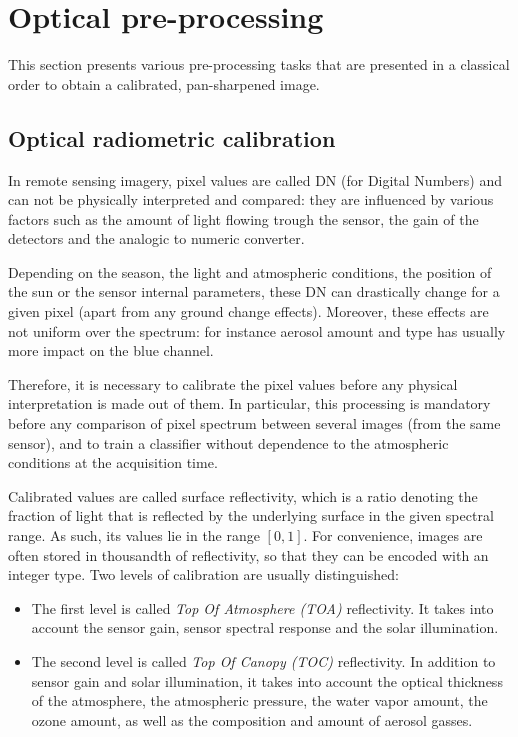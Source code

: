 \section{Optical pre-processing}\label{sec:optpreproc}

This section presents various pre-processing tasks that are presented in 
a classical order to obtain a calibrated, pan-sharpened image. 

\subsection{Optical radiometric calibration}\label{ssec:optcal}

In remote sensing imagery, pixel values are called DN (for Digital
Numbers) and can not be physically interpreted and compared: they are
influenced by various factors such as the amount of light flowing
trough the sensor, the gain of the detectors and the analogic to
numeric converter.

Depending on the season, the light and atmospheric conditions, the
position of the sun or the sensor internal parameters, these DN can
drastically change for a given pixel (apart from any ground change
effects). Moreover, these effects are not uniform over the spectrum:
for instance aerosol amount and type has usually more impact on the
blue channel.

Therefore, it is necessary to calibrate the pixel values before any
physical interpretation is made out of them. In particular, this
processing is mandatory before any comparison of pixel spectrum
between several images (from the same sensor), and to train a
classifier without dependence to the atmospheric conditions at the
acquisition time.

Calibrated values are called surface reflectivity, which is a ratio
denoting the fraction of light that is reflected by the underlying
surface in the given spectral range. As such, its values lie in the
range $[0,1]$. For convenience, images are often stored in thousandth
of reflectivity, so that they can be encoded with an integer type.
Two levels of calibration are usually distinguished:

\begin{itemize}
\item The first level is called \emph{Top Of Atmosphere (TOA)}
  reflectivity. It takes into account the sensor gain, sensor spectral
  response and the solar illumination.
\item The second level is called \emph{Top Of Canopy (TOC)}
  reflectivity. In addition to sensor gain and solar illumination, it
  takes into account the optical thickness of the atmosphere, the
  atmospheric pressure, the water vapor amount, the ozone amount, as
  well as the composition and amount of aerosol gasses.
\end{itemize}

